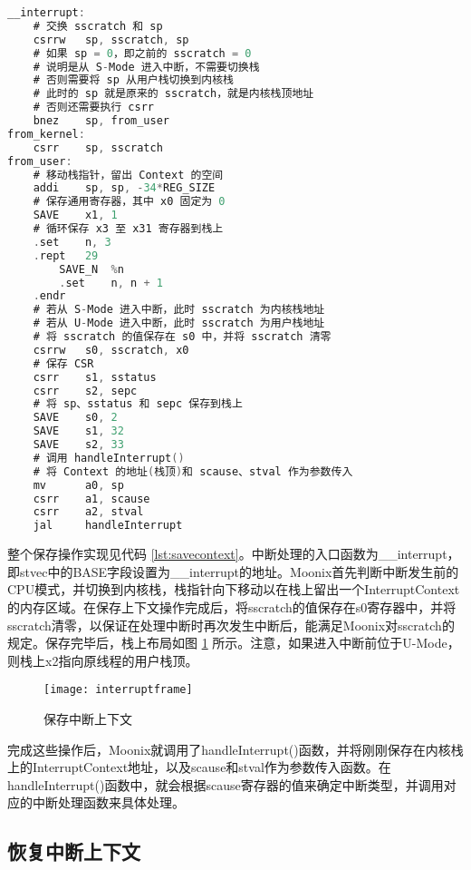 \begin{minipage}[c]{0.95\textwidth}
\begin{lstlisting}[language={C}, caption={保存中断上下文}, label={lst:savecontext}]
__interrupt:
	# 交换 sscratch 和 sp
	csrrw   sp, sscratch, sp
	# 如果 sp = 0，即之前的 sscratch = 0
	# 说明是从 S-Mode 进入中断，不需要切换栈
	# 否则需要将 sp 从用户栈切换到内核栈
	# 此时的 sp 就是原来的 sscratch，就是内核栈顶地址
	# 否则还需要执行 csrr 
	bnez    sp, from_user
from_kernel:
	csrr    sp, sscratch
from_user:
	# 移动栈指针，留出 Context 的空间
	addi    sp, sp, -34*REG_SIZE
	# 保存通用寄存器，其中 x0 固定为 0
	SAVE    x1, 1
	# 循环保存 x3 至 x31 寄存器到栈上
	.set    n, 3
	.rept   29
		SAVE_N  %n
		.set    n, n + 1
	.endr
	# 若从 S-Mode 进入中断，此时 sscratch 为内核栈地址
	# 若从 U-Mode 进入中断，此时 sscratch 为用户栈地址
	# 将 sscratch 的值保存在 s0 中，并将 sscratch 清零
	csrrw   s0, sscratch, x0
	# 保存 CSR
	csrr    s1, sstatus
	csrr    s2, sepc
	# 将 sp、sstatus 和 sepc 保存到栈上 
	SAVE    s0, 2
	SAVE    s1, 32
	SAVE    s2, 33
	# 调用 handleInterrupt()
	# 将 Context 的地址(栈顶)和 scause、stval 作为参数传入
	mv      a0, sp
	csrr    a1, scause
	csrr    a2, stval
	jal     handleInterrupt
\end{lstlisting}
\end{minipage}

整个保存操作实现见代码 \ref{lst:savecontext}。中断处理的入口函数为\_\_interrupt，即stvec中的BASE字段设置为\_\_interrupt的地址。Moonix首先判断中断发生前的CPU模式，并切换到内核栈，栈指针向下移动以在栈上留出一个InterruptContext的内存区域。在保存上下文操作完成后，将sscratch的值保存在s0寄存器中，并将sscratch清零，以保证在处理中断时再次发生中断后，能满足Moonix对sscratch的规定。保存完毕后，栈上布局如图 \ref{pic:interruptframe} 所示。注意，如果进入中断前位于U-Mode，则栈上x2指向原线程的用户栈顶。

\begin{figure}[htpb]
	\centering
	\texttt{[image: interruptframe]}
	\setlength{\abovecaptionskip}{2pt}
	\caption{保存中断上下文}
	\label{pic:interruptframe}
\end{figure}

完成这些操作后，Moonix就调用了handleInterrupt()函数，并将刚刚保存在内核栈上的InterruptContext地址，以及scause和stval作为参数传入函数。在handleInterrupt()函数中，就会根据scause寄存器的值来确定中断类型，并调用对应的中断处理函数来具体处理。

\subsection{恢复中断上下文}

